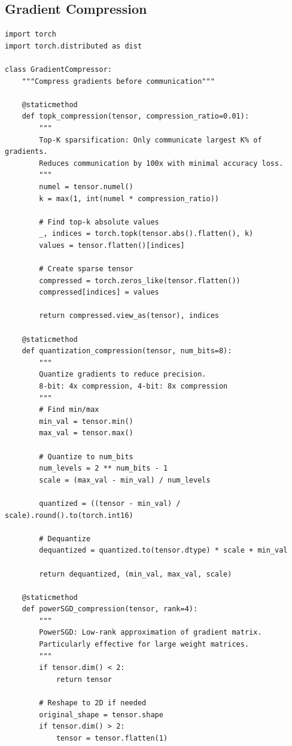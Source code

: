 \subsection{Gradient Compression}

\begin{lstlisting}[style=python, caption=Gradient compression techniques]
import torch
import torch.distributed as dist

class GradientCompressor:
    """Compress gradients before communication"""

    @staticmethod
    def topk_compression(tensor, compression_ratio=0.01):
        """
        Top-K sparsification: Only communicate largest K% of gradients.
        Reduces communication by 100x with minimal accuracy loss.
        """
        numel = tensor.numel()
        k = max(1, int(numel * compression_ratio))

        # Find top-k absolute values
        _, indices = torch.topk(tensor.abs().flatten(), k)
        values = tensor.flatten()[indices]

        # Create sparse tensor
        compressed = torch.zeros_like(tensor.flatten())
        compressed[indices] = values

        return compressed.view_as(tensor), indices

    @staticmethod
    def quantization_compression(tensor, num_bits=8):
        """
        Quantize gradients to reduce precision.
        8-bit: 4x compression, 4-bit: 8x compression
        """
        # Find min/max
        min_val = tensor.min()
        max_val = tensor.max()

        # Quantize to num_bits
        num_levels = 2 ** num_bits - 1
        scale = (max_val - min_val) / num_levels

        quantized = ((tensor - min_val) / scale).round().to(torch.int16)

        # Dequantize
        dequantized = quantized.to(tensor.dtype) * scale + min_val

        return dequantized, (min_val, max_val, scale)

    @staticmethod
    def powerSGD_compression(tensor, rank=4):
        """
        PowerSGD: Low-rank approximation of gradient matrix.
        Particularly effective for large weight matrices.
        """
        if tensor.dim() < 2:
            return tensor

        # Reshape to 2D if needed
        original_shape = tensor.shape
        if tensor.dim() > 2:
            tensor = tensor.flatten(1)


\end{lstlisting}

